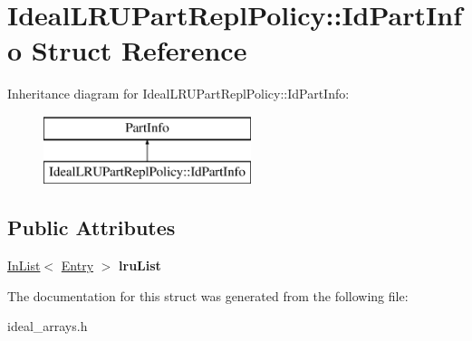 \hypertarget{structIdealLRUPartReplPolicy_1_1IdPartInfo}{\section{Ideal\-L\-R\-U\-Part\-Repl\-Policy\-:\-:Id\-Part\-Info Struct Reference}
\label{structIdealLRUPartReplPolicy_1_1IdPartInfo}
}
Inheritance diagram for Ideal\-L\-R\-U\-Part\-Repl\-Policy\-:\-:Id\-Part\-Info\-:\begin{figure}[H]
\begin{center}
\leavevmode
\includegraphics[height=2.000000cm]{structIdealLRUPartReplPolicy_1_1IdPartInfo}
\end{center}
\end{figure}
\subsection*{Public Attributes}
\begin{DoxyCompactItemize}
\item 
\hypertarget{structIdealLRUPartReplPolicy_1_1IdPartInfo_a38eb26210ad5c2699dae9b51fc496516}{\hyperlink{classInList}{In\-List}$<$ \hyperlink{structIdealLRUPartReplPolicy_1_1Entry}{Entry} $>$ {\bfseries lru\-List}}\label{structIdealLRUPartReplPolicy_1_1IdPartInfo_a38eb26210ad5c2699dae9b51fc496516}

\end{DoxyCompactItemize}


The documentation for this struct was generated from the following file\-:\begin{DoxyCompactItemize}
\item 
ideal\-\_\-arrays.\-h\end{DoxyCompactItemize}
